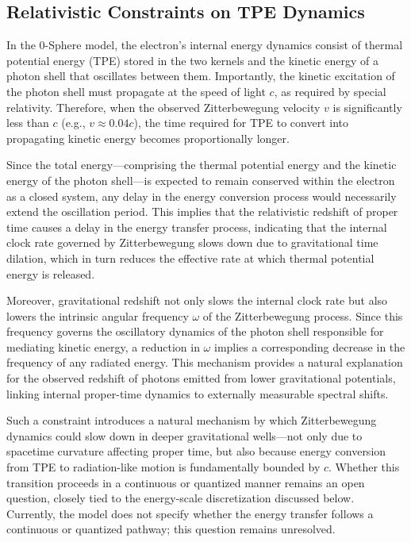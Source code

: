\documentclass[%
 reprint,
 amsmath,amssymb,
 aps,
]{revtex4-1}
\numberwithin{equation}{section}%
\begin{document}
\subsection{Relativistic Constraints on TPE Dynamics}

In the 0-Sphere model, the electron's internal energy dynamics consist of thermal potential energy (TPE) stored in the two kernels and the kinetic energy of a photon shell that oscillates between them. Importantly, the kinetic excitation of the photon shell must propagate at the speed of light $c$, as required by special relativity. Therefore, when the observed Zitterbewegung velocity $v$ is significantly less than $c$ (e.g., $v \approx 0.04c$), the time required for TPE to convert into propagating kinetic energy becomes proportionally longer. 

Since the total energy—comprising the thermal potential energy and the kinetic energy of the photon shell—is expected to remain conserved within the electron as a closed system, any delay in the energy conversion process would necessarily extend the oscillation period. This implies that the relativistic redshift of proper time causes a delay in the energy transfer process, indicating that the internal clock rate governed by Zitterbewegung slows down due to gravitational time dilation, which in turn reduces the effective rate at which thermal potential energy is released.

Moreover, gravitational redshift not only slows the internal clock rate but also lowers the intrinsic angular frequency $\omega$ of the Zitterbewegung process. Since this frequency governs the oscillatory dynamics of the photon shell responsible for mediating kinetic energy, a reduction in $\omega$ implies a corresponding decrease in the frequency of any radiated energy. This mechanism provides a natural explanation for the observed redshift of photons emitted from lower gravitational potentials, linking internal proper-time dynamics to externally measurable spectral shifts.

Such a constraint introduces a natural mechanism by which Zitterbewegung dynamics could slow down in deeper gravitational wells—not only due to spacetime curvature affecting proper time, but also because energy conversion from TPE to radiation-like motion is fundamentally bounded by $c$. Whether this transition proceeds in a continuous or quantized manner remains an open question, closely tied to the energy-scale discretization discussed below. Currently, the model does not specify whether the energy transfer follows a continuous or quantized pathway; this question remains unresolved.
\end{document}
